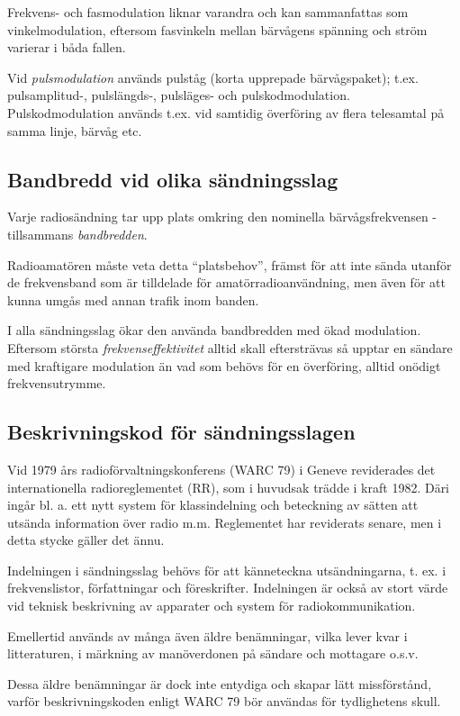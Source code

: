 Frekvens- och fasmodulation liknar varandra och kan sammanfattas som
vinkelmodulation, eftersom fasvinkeln mellan bärvågens spänning och ström
varierar i båda fallen.

Vid \emph{pulsmodulation} används pulståg (korta upprepade bärvågspaket); t.ex.
pulsamplitud-, pulslängds-, pulsläges- och pulskodmodulation. Pulskodmodulation
används t.ex. vid samtidig överföring av flera telesamtal på samma linje,
bärvåg etc.

\subsection{Bandbredd vid olika sändningsslag}

Varje radiosändning tar upp plats omkring den nominella bärvågsfrekvensen -
tillsammans \emph{bandbredden}.

Radioamatören måste veta detta ``platsbehov'', främst för att inte sända utanför
de frekvensband som är tilldelade för amatörradioanvändning, men även för att
kunna umgås med annan trafik inom banden.

I alla sändningsslag ökar den använda bandbredden med ökad modulation. Eftersom
största \emph{frekvenseffektivitet} alltid skall eftersträvas så upptar en
sändare med kraftigare modulation än vad som behövs för en överföring, alltid
onödigt frekvensutrymme.

\subsection{Beskrivningskod för sändningsslagen}

Vid 1979 års radioförvaltningskonferens (WARC 79) i Geneve reviderades det
internationella radioreglementet (RR), som i huvudsak trädde i kraft 1982.
Däri ingår bl. a. ett nytt system för klassindelning och beteckning av sätten
att utsända information över radio m.m. Reglementet har reviderats senare, men
i detta stycke gäller det ännu.

Indelningen i sändningsslag behövs för att känneteckna utsändningarna, t. ex. i
frekvenslistor, författningar och föreskrifter. Indelningen är också av stort
värde vid teknisk beskrivning av apparater och system för radiokommunikation.

Emellertid används av många även äldre benämningar, vilka lever kvar i
litteraturen, i märkning av manöverdonen på sändare och mottagare o.s.v.

Dessa äldre benämningar är dock inte entydiga och skapar lätt missförstånd,
varför beskrivningskoden enligt WARC 79 bör användas för tydlighetens skull.

